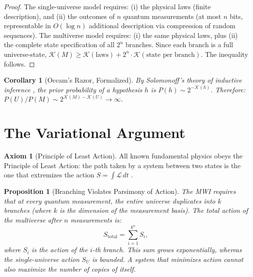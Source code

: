 \documentclass[12pt, a4paper]{article}
\theoremstyle{plain}
\newtheorem{proposition}[theorem]{Proposition}
\newtheorem{corollary}[theorem]{Corollary}
\theoremstyle{definition}
\newtheorem{axiom}[theorem]{Axiom}
\theoremstyle{remark}
\newcommand{\K}{\mathcal{K}}
\begin{document}
\begin{proof}
  The single-universe model requires: (i) the physical laws (finite
  description), and (ii) the outcomes of $n$ quantum measurements (at most
  $n$ bits, representable in $O(\log n)$ additional description via
  compression of random sequences). The multiverse model requires: (i) the
  same physical laws, plus (ii) the complete state specification of all
  $2^n$ branches. Since each branch is a full universe-state, $\K(M) \geq
  \K(\text{laws}) + 2^n \cdot \K(\text{state per branch})$. The inequality
  follows. \qedhere
\end{proof}

\begin{corollary}[Occam's Razor, Formalized]\label{cor:occam}
  By Solomonoff's theory of inductive inference \citep{Solomonoff1964},
  the prior probability of a hypothesis $h$ is $P(h) \sim 2^{-\K(h)}$.
  Therefore: $P(U) / P(M) \sim 2^{\K(M) - \K(U)} \to \infty$.
\end{corollary}

\section{The Variational Argument}\label{sec:least_action}

\begin{axiom}[Principle of Least Action]\label{ax:least_action}
  All known fundamental physics obeys the Principle of Least Action: the
  path taken by a system between two states is the one that extremizes
  the action $S = \int \mathcal{L}\, dt$ \citep{Feynman1942, Landau1976}.
\end{axiom}

\begin{proposition}[Branching Violates Parsimony of Action]\label{prop:branching}
  The MWI requires that at every quantum measurement, the \emph{entire
  universe} duplicates into $k$ branches (where $k$ is the dimension of
  the measurement basis). The total action of the multiverse after $n$
  measurements is:
  \begin{equation}
    S_{\text{total}} = \sum_{i=1}^{k^n} S_i,
  \end{equation}
  where $S_i$ is the action of the $i$-th branch. This sum grows
  exponentially, whereas the single-universe action $S_U$ is bounded.
  A system that minimizes action cannot also maximize the number of
  copies of itself.
\end{proposition}
\end{document}

